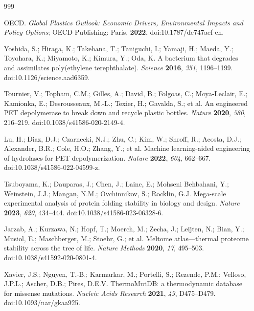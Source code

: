 \documentclass[journal,article,submit,moreauthors]{Definitions/mdpi}
\begin{document}
\begin{thebibliography}{999}

OECD. \textit{Global Plastics Outlook: Economic Drivers, Environmental Impacts and Policy
Options}; OECD Publishing: Paris, \textbf{2022}. doi:10.1787/de747aef-en.

Yoshida, S.; Hiraga, K.; Takehana, T.; Taniguchi, I.; Yamaji, H.; Maeda, Y.; Toyohara, K.;
Miyamoto, K.; Kimura, Y.; Oda, K. A bacterium that degrades and assimilates
poly(ethylene terephthalate). \textit{Science} \textbf{2016}, \textit{351}, 1196--1199.
doi:10.1126/science.aad6359.

Tournier, V.; Topham, C.M.; Gilles, A.; David, B.; Folgoas, C.; Moya-Leclair, E.; Kamionka,
E.; Desrousseaux, M.-L.; Texier, H.; Gavalda, S.; et al. An engineered PET depolymerase to
break down and recycle plastic bottles. \textit{Nature} \textbf{2020}, \textit{580},
216--219. doi:10.1038/s41586-020-2149-4.

Lu, H.; Diaz, D.J.; Czarnecki, N.J.; Zhu, C.; Kim, W.; Shroff, R.; Acosta, D.J.; Alexander,
B.R.; Cole, H.O.; Zhang, Y.; et al. Machine learning-aided engineering of hydrolases for
PET depolymerization. \textit{Nature} \textbf{2022}, \textit{604}, 662--667.
doi:10.1038/s41586-022-04599-z.

Tsuboyama, K.; Dauparas, J.; Chen, J.; Laine, E.; Mohseni Behbahani, Y.; Weinstein, J.J.;
Mangan, N.M.; Ovchinnikov, S.; Rocklin, G.J. Mega-scale experimental analysis of protein
folding stability in biology and design. \textit{Nature} \textbf{2023}, \textit{620},
434--444. doi:10.1038/s41586-023-06328-6.

Jarzab, A.; Kurzawa, N.; Hopf, T.; Moerch, M.; Zecha, J.; Leijten, N.; Bian, Y.; Musiol, E.;
Maschberger, M.; Stoehr, G.; et al. Meltome atlas---thermal proteome stability across the
tree of life. \textit{Nature Methods} \textbf{2020}, \textit{17}, 495--503.
doi:10.1038/s41592-020-0801-4.

Xavier, J.S.; Nguyen, T.-B.; Karmarkar, M.; Portelli, S.; Rezende, P.M.; Velloso, J.P.L.;
Ascher, D.B.; Pires, D.E.V. ThermoMutDB: a thermodynamic database for missense mutations.
\textit{Nucleic Acids Research} \textbf{2021}, \textit{49}, D475--D479.
doi:10.1093/nar/gkaa925.


\end{thebibliography}
\end{document}
